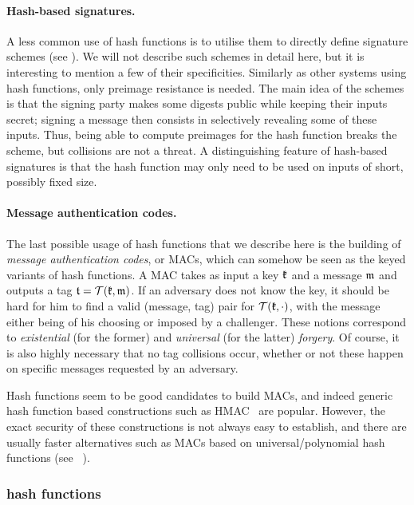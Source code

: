 \paragraph{Hash-based signatures.} A less common use of hash functions is to utilise them to directly define signature schemes (see \eg \cite{DBLP:conf/crypto/Merkle87}). We will not describe such schemes in detail
here, but it is interesting to mention a few of their specificities. Similarly as other systems using hash functions, only preimage resistance is needed. The main
idea of the schemes is that the signing party makes some digests public while keeping their inputs secret; signing a message then consists in selectively revealing some of
these inputs. Thus, being able to compute preimages for the hash function breaks the scheme, but collisions are not a threat.
A distinguishing feature of hash-based signatures is that the hash function may only need to be used on inputs of short, possibly fixed size. 

\paragraph{Message authentication codes.} The last possible usage of hash functions that we describe here is the building of \emph{message authentication codes}, or MACs, which
can somehow be seen as the keyed variants of hash functions. A MAC takes as input a key $\mathfrak{k}$ and a message $\mathfrak{m}$ and outputs a tag $\mathfrak{t} = \operatorname{\mathcal{T}}(\mathfrak{k}, \mathfrak{m})$.
If an adversary does not know the key, it should be hard for him to find a valid (message, tag) pair for $\operatorname{\mathcal{T}}(\mathfrak{k}, \cdot)$, with the message either being of his choosing
or imposed by a challenger. These notions correspond to \emph{existential} (for the former) and \emph{universal} (for the latter) \emph{forgery}. Of course, it is also
highly necessary that no tag collisions occur, whether or not these happen on specific messages requested by an adversary.

Hash functions seem to be good candidates to build MACs, and indeed generic hash function based constructions such as HMAC~\cite{DBLP:conf/crypto/BellareCK96} are popular. However, the exact security of
these constructions is not always easy to establish, and there are usually faster alternatives such as MACs based on universal/polynomial hash functions (see \eg~\cite{DBLP:conf/crypto/BlackHKKR99}).

\subsubsection{\merkdam hash functions}
\label{sec:mdhf}

